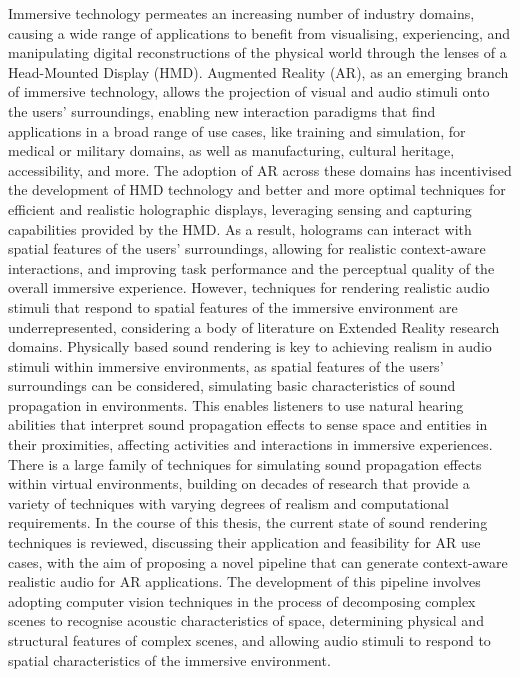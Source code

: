 \beforeabstract{}
Immersive technology permeates an increasing number of industry domains, causing a wide range of applications to benefit from visualising, experiencing, and manipulating digital reconstructions of the physical world through the lenses of a Head-Mounted Display (HMD). Augmented Reality (AR), as an emerging branch of immersive technology, allows the projection of visual and audio stimuli onto the users' surroundings, enabling new interaction paradigms that find applications in a broad range of use cases, like training and simulation, for medical or military domains, as well as manufacturing, cultural heritage, accessibility, and more.
The adoption of AR across these domains has incentivised the development of HMD technology and better and more optimal techniques for efficient and realistic holographic displays, leveraging sensing and capturing capabilities provided by the HMD. As a result, holograms can interact with spatial features of the users' surroundings, allowing for realistic context-aware interactions, and improving task performance and the perceptual quality of the overall immersive experience. However, techniques for rendering realistic audio stimuli that respond to spatial features of the immersive environment are underrepresented, considering a body of literature on Extended Reality research domains. 
Physically based sound rendering is key to achieving realism in audio stimuli within immersive environments, as spatial features of the users' surroundings can be considered, simulating basic characteristics of sound propagation in environments. This enables listeners to use natural hearing abilities that interpret sound propagation effects to sense space and entities in their proximities, affecting activities and interactions in immersive experiences. There is a large family of techniques for simulating sound propagation effects within virtual environments, building on decades of research that provide a variety of techniques with varying degrees of realism and computational requirements.
In the course of this thesis, the current state of sound rendering techniques is reviewed, discussing their application and feasibility for AR use cases, with the aim of proposing a novel pipeline that can generate context-aware realistic audio for AR applications. The development of this pipeline involves adopting computer vision techniques in the process of decomposing complex scenes to recognise acoustic characteristics of space, determining physical and structural features of complex scenes, and allowing audio stimuli to respond to spatial characteristics of the immersive environment.
